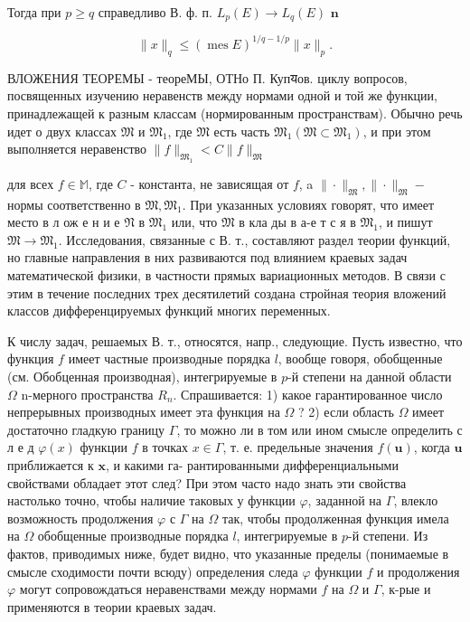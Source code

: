 \documentclass[10pt]{article}
\begin{document}
Тогда при $p \geqslant q$ справедливо В. ф. п. $L_{p}(E) \rightarrow L_{q}(E)$ $\mathbf{n}$



\[

\|x\|_{q} \leqslant(\operatorname{mes} E)^{1 / q-1 / p}\|x\|_{p} .

\]



ВЛОЖЕНИЯ ТЕОРЕМЫ - теореМЫ, ОТНо П. Купयов. циклу вопросов, посвященных изучению неравенств между нормами одной и той же функции, принадлежащей к разным классам (нормированным пространствам). Обычно речь идет о двух классах $\mathfrak{M}$ и $\mathfrak{M}_{1}$, где $\mathfrak{M}$ есть часть $\mathfrak{M}_{1}\left(\mathfrak{M} \subset \mathfrak{M}_{1}\right)$, и при этом выполняется неравенство $\|f\|_{\mathfrak{M}_{1}}<C\|f\|_{\mathfrak{M}}$



для всех $f \in \mathbb{M}$, где $C$ - константа, не зависящая от $f$, a $\|\cdot\|_{\mathfrak{M}},\|\cdot\|_{\mathfrak{M}}-$ нормы соответственно в $\mathfrak{M}, \mathfrak{M}_{1}$. При указанных условиях говорят, что имеет место в л ож е н и е $\mathfrak{N}$ в $\mathfrak{M}_{1}$ или, что $\mathfrak{M}$ в кла ды в а-е т с я в $\mathfrak{M}_{1}$, и пишут $\mathfrak{M} \rightarrow \mathfrak{M}_{1}$. Исследования, связанные с В. т., составляют раздел теории функций, но главные направления в них развиваются под влиянием краевых задач математической физики, в частности прямых вариационных методов. В связи с этим в течение последних трех десятилетий создана стройная теория вложений классов дифференцируемых функций многих переменных.



К числу задач, решаемых В. т., относятся, напр., следующие. Пусть известно, что функция $f$ имеет частные производные порядка $l$, вообще говоря, обобщенные (см. Обобценная производная), интегрируемые в $p$-й степени на данной области $\Omega$ n-мерного пространства $R_{n}$. Спрашивается: 1) какое гарантированное число непрерывных производных имеет эта функция на $\Omega$ ? 2) если область $\Omega$ имеет достаточно гладкую границу $\Gamma$, то можно ли в том или ином смысле определить с л е д $\varphi(x)$ функции $f$ в точках $x \in \Gamma$, т. е. предельные значения $f(\boldsymbol{u})$, когда $\boldsymbol{u}$ приближается к $\boldsymbol{x}$, и какими га- рантированными дифференциальными свойствами обладает этот след? При этом часто надо знать эти свойства настолько точно, чтобы наличие таковых у функции $\varphi$, заданной на $\Gamma$, влекло возможность продолжения $\varphi$ с $\Gamma$ на $\Omega$ так, чтобы продолженная функция имела на $\Omega$ обобщенные производные порядка $l$, интегрируемые в $p$-й степени. Из фактов, приводимых ниже, будет видно, что указанные пределы (понимаемые в смысле сходимости почти всюду) определения следа $\varphi$ функции $f$ и продолжения $\varphi$ могут сопровождаться неравенствами между нормами $f$ на $\Omega$ и $\Gamma$, к-рые и применяются в теории краевых задач.
\end{document}
